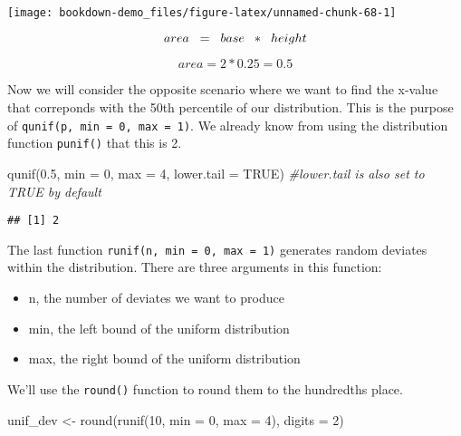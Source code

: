 \documentclass[
]{book}
\newenvironment{Shaded}{\begin{snugshade}}{\end{snugshade}}
\newcommand{\AttributeTok}[1]{\textcolor[rgb]{0.77,0.63,0.00}{#1}}
\newcommand{\CommentTok}[1]{\textcolor[rgb]{0.56,0.35,0.01}{\textit{#1}}}
\newcommand{\ConstantTok}[1]{\textcolor[rgb]{0.00,0.00,0.00}{#1}}
\newcommand{\DecValTok}[1]{\textcolor[rgb]{0.00,0.00,0.81}{#1}}
\newcommand{\FloatTok}[1]{\textcolor[rgb]{0.00,0.00,0.81}{#1}}
\newcommand{\FunctionTok}[1]{\textcolor[rgb]{0.00,0.00,0.00}{#1}}
\newcommand{\NormalTok}[1]{#1}
\newcommand{\OtherTok}[1]{\textcolor[rgb]{0.56,0.35,0.01}{#1}}
\begin{document}
\begin{center}\texttt{[image: bookdown-demo\_files/figure-latex/unnamed-chunk-68-1]} \end{center}

\[ area \hspace{0.2 cm}= \hspace{0.2 cm}base \hspace{0.2cm} * \hspace{0.2 cm}height\]

\[area = 2*0.25=0.5\]

Now we will consider the opposite scenario where we want to find the x-value that correponds with the 50th percentile of our distribution. This is the purpose of \texttt{qunif(p,\ min\ =\ 0,\ max\ =\ 1)}. We already know from using the distribution function \texttt{punif()} that this is 2.

\begin{Shaded}
\begin{Highlighting}[]
\FunctionTok{qunif}\NormalTok{(}\FloatTok{0.5}\NormalTok{, }\AttributeTok{min =} \DecValTok{0}\NormalTok{, }\AttributeTok{max =} \DecValTok{4}\NormalTok{, }\AttributeTok{lower.tail =} \ConstantTok{TRUE}\NormalTok{) }\CommentTok{\#lower.tail is also set to TRUE by default}
\end{Highlighting}
\end{Shaded}

\begin{verbatim}
## [1] 2
\end{verbatim}

The last function \texttt{runif(n,\ min\ =\ 0,\ max\ =\ 1)} generates random deviates within the distribution. There are three arguments in this function:

\begin{itemize}
\item
  n, the number of deviates we want to produce
\item
  min, the left bound of the uniform distribution
\item
  max, the right bound of the uniform distribution
\end{itemize}

We'll use the \texttt{round()} function to round them to the hundredths place.

\begin{Shaded}
\begin{Highlighting}[]
\NormalTok{unif\_dev }\OtherTok{\textless{}{-}} \FunctionTok{round}\NormalTok{(}\FunctionTok{runif}\NormalTok{(}\DecValTok{10}\NormalTok{, }\AttributeTok{min =} \DecValTok{0}\NormalTok{, }\AttributeTok{max =} \DecValTok{4}\NormalTok{), }\AttributeTok{digits =} \DecValTok{2}\NormalTok{)}
\end{Highlighting}
\end{Shaded}
\end{document}
